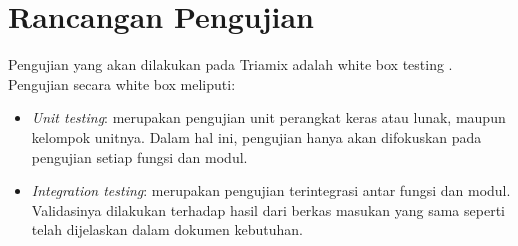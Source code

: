 \documentclass[a4paper,11pt]{report}
\begin{document}
\chapter{Rancangan Pengujian}
Pengujian yang akan dilakukan pada Triamix adalah white box testing \cite{whitebox,iso}. Pengujian secara white box meliputi:
\begin{itemize}
  \item \textit{Unit testing}: merupakan pengujian unit perangkat keras atau lunak, maupun kelompok unitnya. Dalam hal ini, pengujian hanya akan difokuskan pada pengujian setiap fungsi dan modul.
  \item \textit{Integration testing}: merupakan pengujian terintegrasi antar fungsi dan modul. Validasinya dilakukan terhadap hasil dari berkas masukan yang sama seperti telah dijelaskan dalam dokumen kebutuhan.
\end{itemize}



%	
%	
\end{document}
